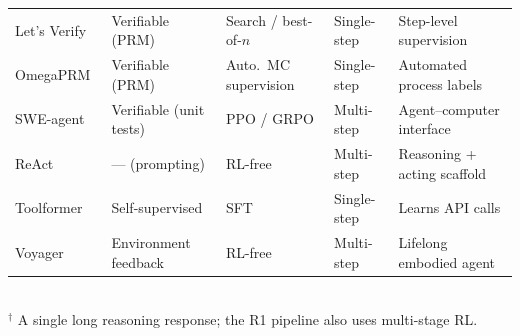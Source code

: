 \begin{table}[t]
\begin{tabular}{@{}llllp{}@{}}
Let's Verify~\cite{lightman2023verify}          & Verifiable (PRM)          & Search / best-of-$n$ & Single-step & Step-level supervision \\
OmegaPRM~\cite{wang2024omegaprm}                 & Verifiable (PRM)          & Auto.\ MC supervision & Single-step & Automated process labels \\
SWE-agent~\cite{yang2024sweagent}               & Verifiable (unit tests)   & PPO / GRPO     & Multi-step  & Agent--computer interface \\
ReAct~\cite{yao2023react}                        & --- (prompting)           & RL-free        & Multi-step  & Reasoning + acting scaffold \\
Toolformer~\cite{schick2023toolformer}          & Self-supervised           & SFT            & Single-step & Learns API calls \\
Voyager~\cite{wang2023voyager}                   & Environment feedback      & RL-free        & Multi-step  & Lifelong embodied agent \\
\bottomrule
\end{tabular}\\[2pt]
{\footnotesize $^\dagger$ A single long reasoning response; the
R1 pipeline also uses multi-stage RL.}
\end{table}
